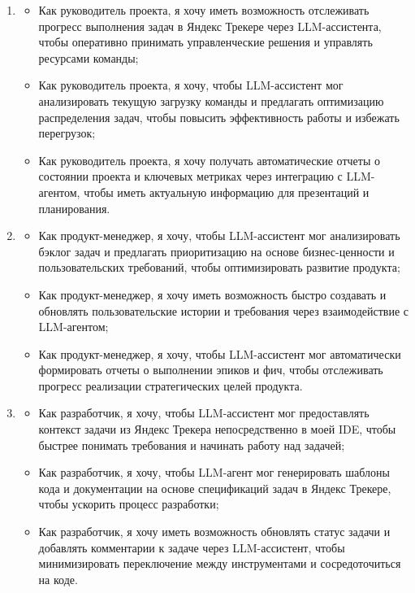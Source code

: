 \documentclass[utf8, russian]{eskdtext}
\begin{document}
\begin{enumerate}
    \item {}
    \begin{itemize}
        \item Как руководитель проекта, я хочу иметь возможность отслеживать прогресс выполнения задач в Яндекс Трекере через LLM-ассистента, чтобы оперативно принимать управленческие решения и управлять ресурсами команды;
        \item Как руководитель проекта, я хочу, чтобы LLM-ассистент мог анализировать текущую загрузку команды и предлагать оптимизацию распределения задач, чтобы повысить эффективность работы и избежать перегрузок;
        \item Как руководитель проекта, я хочу получать автоматические отчеты о состоянии проекта и ключевых метриках через интеграцию с LLM-агентом, чтобы иметь актуальную информацию для презентаций и планирования.
    \end{itemize}
    
    \item {}
    \begin{itemize}
        \item Как продукт-менеджер, я хочу, чтобы LLM-ассистент мог анализировать бэклог задач и предлагать приоритизацию на основе бизнес-ценности и пользовательских требований, чтобы оптимизировать развитие продукта;
        \item Как продукт-менеджер, я хочу иметь возможность быстро создавать и обновлять пользовательские истории и требования через взаимодействие с LLM-агентом;
        \item Как продукт-менеджер, я хочу, чтобы LLM-ассистент мог автоматически формировать отчеты о выполнении эпиков и фич, чтобы отслеживать прогресс реализации стратегических целей продукта.
    \end{itemize}
    
    \item {}
    \begin{itemize}
        \item Как разработчик, я хочу, чтобы LLM-ассистент мог предоставлять контекст задачи из Яндекс Трекера непосредственно в моей IDE, чтобы быстрее понимать требования и начинать работу над задачей;
        \item Как разработчик, я хочу, чтобы LLM-агент мог генерировать шаблоны кода и документации на основе спецификаций задач в Яндекс Трекере, чтобы ускорить процесс разработки;
        \item Как разработчик, я хочу иметь возможность обновлять статус задачи и добавлять комментарии к задаче через LLM-ассистент, чтобы минимизировать переключение между инструментами и сосредоточиться на коде.
    \end{itemize}
    

\end{enumerate}
\end{document}
